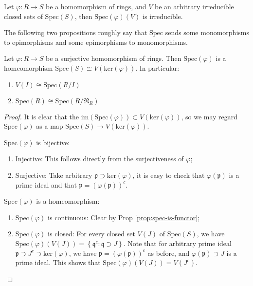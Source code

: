\documentclass{note-eng}
\begin{document}
\begin{corollary}
    Let $\varphi: R \rightarrow S$ be a homomorphism of rings, and $V$ be an arbitrary irreducible closed sets of $\mathrm{Spec}(S)$, then $\mathrm{Spec}(\varphi)(V)$ is irreducible.
\end{corollary}

The following two propositions roughly say that $\mathrm{Spec}$ sends some monomorphisms to epimorphisms and some epimorphisms to monomorphisms.

\begin{proposition}\label{prop:surj-spec-properties}
    Let $\varphi: R \rightarrow S$ be a surjective homomorphism of rings. Then $\mathrm{Spec}(\varphi)$ is a homeomorphism $\mathrm{Spec}(S) \cong V(\mathrm{ker}(\varphi))$. In particular:
    \begin{enumerate}
        \item $V(I) \cong \mathrm{Spec}(R / I)$
        \item $\mathrm{Spec}(R) \cong \mathrm{Spec}(R / \mathfrak{N}_R)$
    \end{enumerate}
\end{proposition}

\begin{proof}
    It is clear that the $\mathrm{im} (\mathrm{Spec}(\varphi)) \subset V(\mathrm{ker}(\varphi))$, so we may regard $\mathrm{Spec}(\varphi)$ as a map $\mathrm{Spec}(S) \rightarrow V(\mathrm{ker}(\varphi))$.

    $\mathrm{Spec}(\varphi)$ is bijective:
    \begin{enumerate}
        \item Injective: This follows directly from the surjectiveness of $\varphi$;
        \item Surjective: Take arbitrary $\mathfrak{p} \supset \mathrm{ker}(\varphi)$, it is easy to check that $\varphi(\mathfrak{p})$ is a prime ideal and that $\mathfrak{p} = (\varphi(\mathfrak{p}))^c$.
    \end{enumerate}

    $\mathrm{Spec}(\varphi)$ is a homeomorphism:
    \begin{enumerate}
        \item $\mathrm{Spec}(\varphi)$ is continuous: Clear by Prop \ref{prop:spec-is-functor};
        \item $\mathrm{Spec}(\varphi)$ is closed: For every closed set $V(J)$ of $\mathrm{Spec}(S)$, we have $\mathrm{Spec}(\varphi)(V(J)) = \left\lbrace \mathfrak{q}^c: \mathfrak{q} \supset J \right\rbrace$. Note that for arbitrary prime ideal $\mathfrak{p} \supset J^c \supset \mathrm{ker} (\varphi)$, we have $\mathfrak{p} = (\varphi(\mathfrak{p}))^c$ as before, and $\varphi(\mathfrak{p}) \supset J$ is a prime ideal. This shows that $\mathrm{Spec}(\varphi)(V(J)) = V(J^c)$.
    \end{enumerate}
\end{proof}
\end{document}
